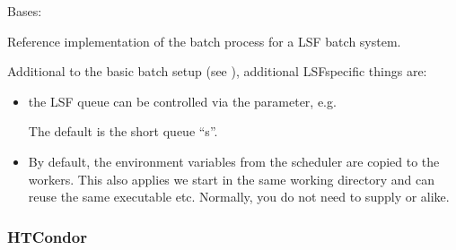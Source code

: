 \documentclass[letterpaper,10pt,english]{sphinxmanual}
\begin{document}
\begin{fulllineitems}
\label{\detokenize{usage/batch:b2luigi.batch.processes.lsf.LSFProcess}}
Bases: {\hyperref[\detokenize{usage/batch:b2luigi.batch.processes.BatchProcess}]{}}

Reference implementation of the batch process for a LSF batch system.

Additional to the basic batch setup (see {\hyperref[\detokenize{usage/batch:batch-label}]{}}), additional
LSF\sphinxhyphen{}specific things are:
\begin{itemize}
\item {} 
the LSF queue can be controlled via the  parameter, e.g.

\begin{sphinxVerbatim}[commandchars=\\\{\}]
 
      
\end{sphinxVerbatim}

The default is the short queue “s”.

\item {} 
By default, the environment variables from the scheduler are copied to
the workers.
This also applies we start in the same working directory and can reuse
the same executable etc.
Normally, you do not need to supply  or alike.

\end{itemize}

\end{fulllineitems}



\subsubsection{HTCondor}
\label{\detokenize{usage/batch:htcondor}}
\end{document}
